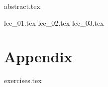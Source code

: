 \documentclass[a4paper, english, fancyfoot, git, dvipsnames]{mkessler-script}
\author{Maximilian Keßler}
\begin{document}
    \maketitle

    {abstract.tex}

    \cleardoublepage
    \tableofcontents

    \cleardoublepage
    \summaryoflectures

    \cleardoublepage
    {lec_01.tex}
    {lec_02.tex}
    {lec_03.tex}

    \cleardoublepage
    \appendix
    \part{Appendix}

    {exercises.tex}
    

    \cleardoublepage
    \printvocabindex


    \cleardoublepage
    \printliterature
\end{document}
